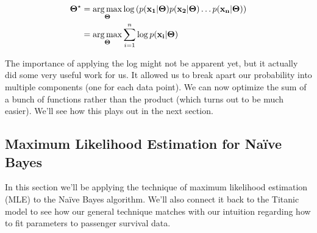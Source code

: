\documentclass[assignment03_Solutions]{subfiles}
\begin{document}
\begin{align}
\mathbf{\Theta^\star} &= \operatorname*{arg\,max}_{\mathbf{\Theta}} \log \left ( p(\mathbf{x_1} |  \mathbf{\Theta}) p(\mathbf{x_2} | \mathbf{\Theta}) \ldots p(\mathbf{x_n} | \mathbf{\Theta})  \right) \nonumber \\
&=  \operatorname*{arg\,max}_{\mathbf{\Theta}} \sum_{i=1}^n \log p(\mathbf{x_i} |  \mathbf{\Theta})  \label{eq:mleiidlog}
\end{align}

The importance of applying the log might not be apparent yet, but it actually did some very useful work for us.  It allowed us to break apart our probability into multiple components (one for each data point).  We can now optimize the sum of a bunch of functions rather than the product (which turns out to be much easier).  We'll see how this plays out in the next section.

\subsection{Maximum Likelihood Estimation for Na\"ive Bayes}

In this section we'll be applying the technique of maximum likelihood estimation (MLE) to the Na\"ive Bayes algorithm.  We'll also connect it back to the Titanic model to see how our general technique matches with our intuition regarding how to fit parameters to passenger survival data.
\end{document}
